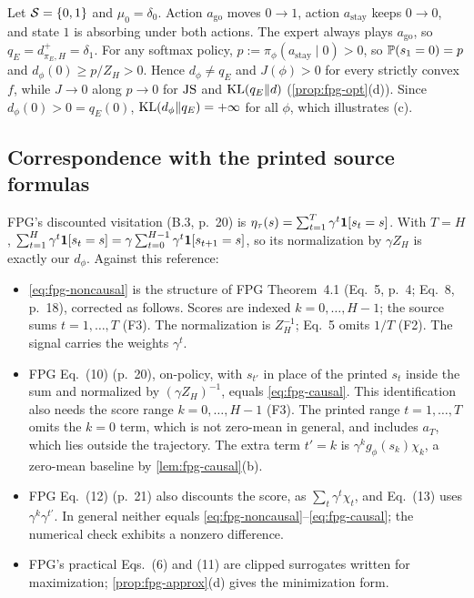 \begin{example}\label{ex:fpg-noattain}
Let $\mathcal{S}=\{0,1\}$ and $\mu_0=\delta_0$. Action $a_{\mathrm{go}}$ moves $0\to1$, action $a_{\mathrm{stay}}$ keeps $0\to0$, and state $1$ is absorbing under both actions.
The expert always plays $a_{\mathrm{go}}$, so $q_E=d^+_{\pi_E,H}=\delta_1$.
For any softmax policy, $p:=\pi_\phi(a_{\mathrm{stay}}\mid0)>0$, so $\mathbb{P}(s_1=0)=p$ and $d_\phi(0)\ge p/Z_H>0$. Hence $d_\phi\ne q_E$ and $J(\phi)>0$ for every strictly convex $f$, while $J\to0$ along $p\to0$ for $\mathrm{JS}$ and $\mathrm{KL}(q_E\Vert d)$ (\cref{prop:fpg-opt}(d)).
Since $d_\phi(0)>0=q_E(0)$, $\mathrm{KL}(d_\phi\Vert q_E)=+\infty$ for all $\phi$, which illustrates (c).
\end{example}

\subsection{Correspondence with the printed source formulas}\label{sec:fpg-source}

\begin{remark}\label{rem:fpg-source}
FPG's discounted visitation (B.3, p.~20) is $\eta_\tau(s)=\sum_{t=1}^T\gamma^t\mathbf{1}[s_t=s]$.
With $T=H$, $\sum_{t=1}^H\gamma^t\mathbf{1}[s_t=s]=\gamma\sum_{t=0}^{H-1}\gamma^t\mathbf{1}[s_{t+1}=s]$, so its normalization by $\gamma Z_H$ is exactly our $d_\phi$.
Against this reference:
\begin{itemize}[nosep]
\item \eqref{eq:fpg-noncausal} is the structure of FPG Theorem~4.1 (Eq.~5, p.~4; Eq.~8, p.~18), corrected as follows.
  Scores are indexed $k=0,\dots,H-1$; the source sums $t=1,\dots,T$ (F3).
  The normalization is $Z_H^{-1}$; Eq.~5 omits $1/T$ (F2).
  The signal carries the weights $\gamma^t$.
\item FPG Eq.~(10) (p.~20), on-policy, with $s_{t'}$ in place of the printed $s_t$ inside the sum and normalized by $(\gamma Z_H)^{-1}$, equals \eqref{eq:fpg-causal}.
  This identification also needs the score range $k=0,\dots,H-1$ (F3).
  The printed range $t=1,\dots,T$ omits the $k=0$ term, which is not zero-mean in general, and includes $a_T$, which lies outside the trajectory.
  The extra term $t'=k$ is $\gamma^kg_\phi(s_k)\chi_k$, a zero-mean baseline by \cref{lem:fpg-causal}(b).
\item FPG Eq.~(12) (p.~21) also discounts the score, as $\sum_t\gamma^t\chi_t$, and Eq.~(13) uses $\gamma^k\gamma^{t'}$. In general neither equals \eqref{eq:fpg-noncausal}--\eqref{eq:fpg-causal}; the numerical check exhibits a nonzero difference.
\item FPG's practical Eqs.~(6) and (11) are clipped surrogates written for maximization; \cref{prop:fpg-approx}(d) gives the minimization form.
\end{itemize}
\end{remark}

